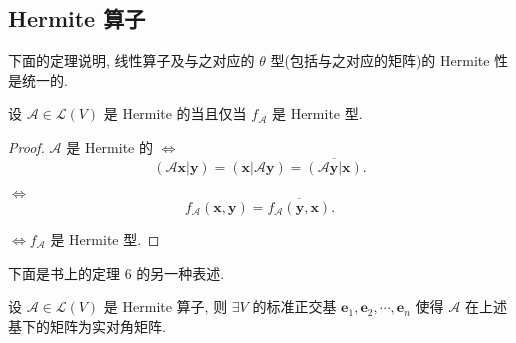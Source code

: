 \documentclass[color=black,device=normal,lang=cn,mode=geye]{elegantnote}
\begin{document}
\subsection{Hermite 算子}
下面的定理说明, 线性算子及与之对应的 $\theta$ 型(包括与之对应的矩阵)的 Hermite 性是统一的.
\begin{theorem}
    设 $\mathcal{A}\in\mathcal{L}(V)$ 是 Hermite 的当且仅当 $f_\mathcal{A}$ 是 Hermite 型.
\end{theorem}
\begin{proof}
    $\mathcal{A}$ 是 Hermite 的 $\Leftrightarrow$
    \[(\mathcal{A}\boldsymbol{x}|\boldsymbol{y})=(\boldsymbol{x}|\mathcal{A}\boldsymbol{y})=\overline{(\mathcal{A}\boldsymbol{y}|\boldsymbol{x})}.\]

    $\Leftrightarrow$
    \[f_\mathcal{A}(\boldsymbol{x},\boldsymbol{y})=\overline{f_\mathcal{A}(\boldsymbol{y},\boldsymbol{x})}.\]

    $\Leftrightarrow f_\mathcal{A}$ 是 Hermite 型.
\end{proof}
下面是书上的定理 6 的另一种表述.
\begin{theorem}[书上的定理 6]\label{t3.5}
    设 $\mathcal{A}\in\mathcal{L}(V)$ 是 Hermite 算子, 则 $\exists V$ 的标准正交基 $\boldsymbol{e}_1,\boldsymbol{e}_2,\cdots,\boldsymbol{e}_n$ 使得 $\mathcal{A}$ 在上述基下的矩阵为实对角矩阵.
\end{theorem}
\end{document}
